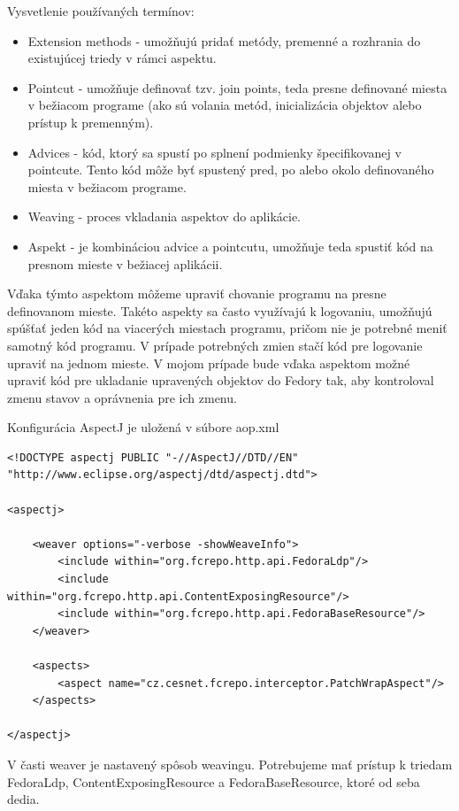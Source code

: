 \documentclass[thesis=M,slovak]{FITthesis}[2013/05/06]
\begin{document}
Vysvetlenie používaných termínov:
\begin{itemize}
	\item Extension methods - umožňujú pridať metódy, premenné a rozhrania do existujúcej triedy v rámci aspektu.
	\item Pointcut - umožňuje definovať tzv. join points, teda presne definované miesta v bežiacom programe (ako sú volania metód, inicializácia objektov alebo prístup k premenným).
	\item Advices - kód, ktorý sa spustí po splnení podmienky špecifikovanej v pointcute. Tento kód môže byť spustený pred, po alebo okolo definovaného miesta v bežiacom programe.
	\item Weaving - proces vkladania aspektov do aplikácie.
	\item Aspekt - je kombináciou advice a pointcutu, umožňuje teda spustiť kód na presnom mieste v bežiacej aplikácii.
\end{itemize}
Vďaka týmto aspektom môžeme upraviť chovanie programu na presne definovanom mieste. Takéto aspekty sa často využívajú k logovaniu, umožňujú spúšťať jeden kód na viacerých miestach programu, pričom nie je potrebné meniť samotný kód programu. V prípade potrebných zmien stačí kód pre logovanie upraviť na jednom mieste. \cite{aspect} V mojom prípade bude vďaka aspektom možné upraviť kód pre ukladanie upravených objektov do Fedory tak, aby kontroloval zmenu stavov a oprávnenia pre ich zmenu.

Konfigurácia AspectJ je uložená v súbore aop.xml
\lstset{language=XML}
\begin{lstlisting}[frame=single] 
<!DOCTYPE aspectj PUBLIC "-//AspectJ//DTD//EN" "http://www.eclipse.org/aspectj/dtd/aspectj.dtd">

<aspectj>

    <weaver options="-verbose -showWeaveInfo">
        <include within="org.fcrepo.http.api.FedoraLdp"/>
        <include within="org.fcrepo.http.api.ContentExposingResource"/>
        <include within="org.fcrepo.http.api.FedoraBaseResource"/>
    </weaver>

    <aspects>
        <aspect name="cz.cesnet.fcrepo.interceptor.PatchWrapAspect"/>
    </aspects>

</aspectj>
\end{lstlisting}
V časti weaver je nastavený spôsob weavingu. Potrebujeme mať prístup k triedam FedoraLdp, ContentExposingResource a FedoraBaseResource, ktoré od seba dedia.
\end{document}
